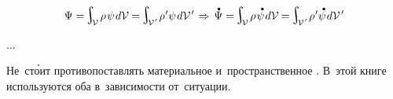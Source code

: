 \begin{otherlanguage}{russian}
\nopagebreak\begin{equation*}
\Psi = \hspace{-0.25ex}\scalebox{1.4}{$\integral$}_{\hspace{-0.5ex}\raisemath{-0.05em}{\mathcal{V}}} \hspace{.3ex} \rho \hspace{.2ex} \psi \hspace{.2ex} d\mathcal{V} \hspace{-0.1ex}
= \hspace{-0.2ex} \scalebox{1.4}{$\integral$}_{\hspace{-0.5ex}\raisemath{-0.05em}{\mathcal{V}\hspace{.12ex}'}} \hspace{.2ex} \rho \hspace{.1ex}' \psi \hspace{.2ex} d\mathcal{V}\hspace{.2ex}'
\hspace{.2ex} \Rightarrow \hspace{.33ex}
\mathdotabove{\Psi} = \hspace{-0.25ex}\scalebox{1.4}{$\integral$}_{\hspace{-0.5ex}\raisemath{-0.05em}{\mathcal{V}}} \hspace{.3ex} \rho \hspace{.2ex} \mathdotabove{\psi} \hspace{.2ex} d\mathcal{V} \hspace{-0.1ex}
= \hspace{-0.2ex} \scalebox{1.4}{$\integral$}_{\hspace{-0.5ex}\raisemath{-0.05em}{\mathcal{V}\hspace{.12ex}'}} \hspace{.2ex} \rho \hspace{.1ex}' \mathdotabove{\psi} \hspace{.2ex} d\mathcal{V}\hspace{.2ex}'
\end{equation*}

...

Не~ст\'{о}ит противопоставлять материальное и~пространственное .
В~этой книге используются оба в~зависимости от~ситуации.

\end{otherlanguage}

\newpage


